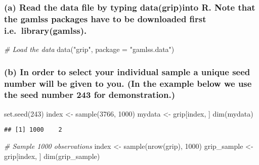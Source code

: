 \documentclass[
]{article}
\newenvironment{Shaded}{\begin{snugshade}}{\end{snugshade}}
\newcommand{\AttributeTok}[1]{\textcolor[rgb]{0.77,0.63,0.00}{#1}}
\newcommand{\CommentTok}[1]{\textcolor[rgb]{0.56,0.35,0.01}{\textit{#1}}}
\newcommand{\DecValTok}[1]{\textcolor[rgb]{0.00,0.00,0.81}{#1}}
\newcommand{\FunctionTok}[1]{\textcolor[rgb]{0.00,0.00,0.00}{#1}}
\newcommand{\NormalTok}[1]{#1}
\newcommand{\OtherTok}[1]{\textcolor[rgb]{0.56,0.35,0.01}{#1}}
\newcommand{\StringTok}[1]{\textcolor[rgb]{0.31,0.60,0.02}{#1}}
\begin{document}
\hypertarget{a-read-the-data-file-by-typing-datagripinto-r.-note-that-the-gamlss-packages-have-to-be-downloaded-first-i.e.-librarygamlss.}{%
\subsubsection{(a) Read the data file by typing data(grip)into R. Note
that the gamlss packages have to be downloaded first
i.e.~library(gamlss).}\label{a-read-the-data-file-by-typing-datagripinto-r.-note-that-the-gamlss-packages-have-to-be-downloaded-first-i.e.-librarygamlss.}}

\begin{Shaded}
\begin{Highlighting}[]
\CommentTok{\# Load the data}
\FunctionTok{data}\NormalTok{(}\StringTok{"grip"}\NormalTok{, }\AttributeTok{package =} \StringTok{"gamlss.data"}\NormalTok{)}
\end{Highlighting}
\end{Shaded}

\hypertarget{b-in-order-to-select-your-individual-sample-a-unique-seed-number-will-be-given-to-you.-in-the-example-below-we-use-the-seed-number-243-for-demonstration.}{%
\subsubsection{(b) In order to select your individual sample a unique
seed number will be given to you. (In the example below we use the seed
number 243 for
demonstration.)}\label{b-in-order-to-select-your-individual-sample-a-unique-seed-number-will-be-given-to-you.-in-the-example-below-we-use-the-seed-number-243-for-demonstration.}}

\begin{Shaded}
\begin{Highlighting}[]
\FunctionTok{set.seed}\NormalTok{(}\DecValTok{243}\NormalTok{) }
\NormalTok{index }\OtherTok{\textless{}{-}} \FunctionTok{sample}\NormalTok{(}\DecValTok{3766}\NormalTok{, }\DecValTok{1000}\NormalTok{) }
\NormalTok{mydata }\OtherTok{\textless{}{-}}\NormalTok{ grip[index, ] }
\FunctionTok{dim}\NormalTok{(mydata)}
\end{Highlighting}
\end{Shaded}

\begin{verbatim}
## [1] 1000    2
\end{verbatim}

\begin{Shaded}
\begin{Highlighting}[]
\CommentTok{\# Sample 1000 observations}
\NormalTok{index }\OtherTok{\textless{}{-}} \FunctionTok{sample}\NormalTok{(}\FunctionTok{nrow}\NormalTok{(grip), }\DecValTok{1000}\NormalTok{)}
\NormalTok{grip\_sample }\OtherTok{\textless{}{-}}\NormalTok{ grip[index, ]}
\FunctionTok{dim}\NormalTok{(grip\_sample)}
\end{Highlighting}
\end{Shaded}
\end{document}
